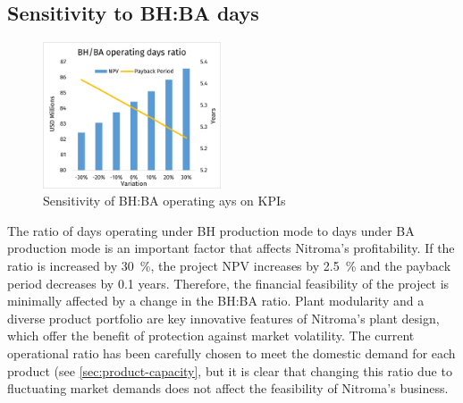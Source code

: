 \subsection{Sensitivity to BH:BA days}
\label{sec:sensitivity-ratiodays}
\begin{figure}
    \caption{Sensitivity of BH:BA operating ays on KPIs}
    \label{Sensitivity_BHBA}
    \includegraphics[width=0.47\textwidth]{chapters/6-economics/figures/Sensitivity_OperatingDays.jpg}
\end{figure}
The ratio of days operating under BH production mode to days under BA production mode is an important factor that affects Nitroma’s profitability. If the ratio is increased by \SI{30}{\percent}, the project NPV increases by \SI{2.5}{\percent} and the payback period decreases by 0.1 years. Therefore, the financial feasibility of the project is minimally affected by a change in the BH:BA ratio. Plant modularity and a diverse product portfolio are key innovative features of Nitroma’s plant design, which offer the benefit of protection against market volatility. The current operational ratio has been carefully chosen to meet the domestic demand for each product (see \cref{sec:product-capacity}, but it is clear that changing this ratio due to fluctuating market demands does not affect the feasibility of Nitroma’s business.